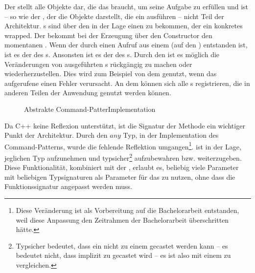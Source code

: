       Der  stellt alle Objekte dar, die das  braucht, um seine Aufgabe zu erfüllen und ist -- so wie der , der die Objekte darstellt, die ein  ausführen -- nicht Teil der Architektur. s sind über den  in der Lage einen  zu bekommen, der ein konkretes  wrapped. Der  bekommt bei der Erzeugung über den Constructor den momentanen . Wenn der  durch einen Aufruf aus einem  (auf den ) entstanden ist, ist es der  des s. Ansonsten ist es der  des s. Durch den  ist es möglich die Veränderungen von ausgeführten s rückgängig zu machen oder wiederherzustellen. Dies wird zum Beispiel von dem  genutzt, wenn das aufgerufene  einen Fehler verursacht. An dem  können sich alle s registrieren, die in anderen Teilen der Anwendung genutzt werden können.

      \begin{figure}[H]
        \centering
        \caption{Abstrakte Command-PatterImplementation}
        \label{fig:commanduml}
      \end{figure}

      Da C++ keine Reflexion \autocites{vinoski2005time}{ferber1989computational} unterstützt, ist die Signatur der  Methode ein wichtiger Punkt der Architektur. Durch den \myTIn$any$ \autocite{cpp-fundamentals} Typ, in der Implementation des Command-Patterns, wurde die fehlende Reflektion umgangen\footnote{
         Diese Veränderung ist als Vorbereitung auf die Bachelorarbeit entstanden, weil diese Anpassung den Zeitrahmen der Bachelorarbeit überschritten hätte.
      }.  ist in der Lage, jeglichen Typ aufzunehmen und typsicher\footnote{
        Typsicher bedeutet, dass ein  nicht zu einem  gecastet werden kann -- es bedeutet nicht, dass  implizit zu  gecastet wird -- es ist also mit einem  zu vergleichen.
      } aufzubewahren bzw. weiterzugeben. Diese Funktionalität, kombiniert mit der , erlaubt es, beliebig viele Parameter mit beliebigen Typsignaturen als Parameter für das  zu nutzen, ohne dass die Funktionssignatur angepasst werden muss.

